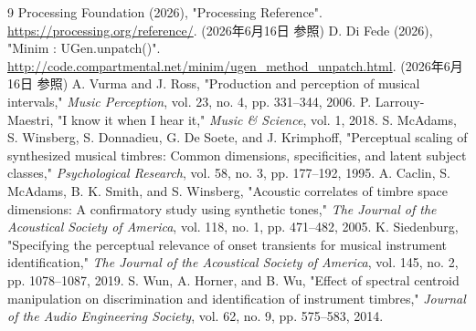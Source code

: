 \documentclass[lualatex,paper=a4paper,jafontsize=11.5pt,jafontscale=1.05]{jlreq}
\begin{document}
\begin{thebibliography}{9}
 Processing Foundation (2026), "Processing Reference". \url{https://processing.org/reference/}. (2026年6月16日 参照)
 D. Di Fede (2026), "Minim : UGen.unpatch()". \url{http://code.compartmental.net/minim/ugen_method_unpatch.html}. (2026年6月16日 参照)
 A. Vurma and J. Ross, "Production and perception of musical intervals," \textit{Music Perception}, vol. 23, no. 4, pp. 331--344, 2006.
 P. Larrouy-Maestri, "I know it when I hear it," \textit{Music \& Science}, vol. 1, 2018.
 S. McAdams, S. Winsberg, S. Donnadieu, G. De Soete, and J. Krimphoff, "Perceptual scaling of synthesized musical timbres: Common dimensions, specificities, and latent subject classes," \textit{Psychological Research}, vol. 58, no. 3, pp. 177--192, 1995.
 A. Caclin, S. McAdams, B. K. Smith, and S. Winsberg, "Acoustic correlates of timbre space dimensions: A confirmatory study using synthetic tones," \textit{The Journal of the Acoustical Society of America}, vol. 118, no. 1, pp. 471--482, 2005.
 K. Siedenburg, "Specifying the perceptual relevance of onset transients for musical instrument identification," \textit{The Journal of the Acoustical Society of America}, vol. 145, no. 2, pp. 1078--1087, 2019.
 S. Wun, A. Horner, and B. Wu, "Effect of spectral centroid manipulation on discrimination and identification of instrument timbres," \textit{Journal of the Audio Engineering Society}, vol. 62, no. 9, pp. 575--583, 2014.
\end{thebibliography}
\end{document}
